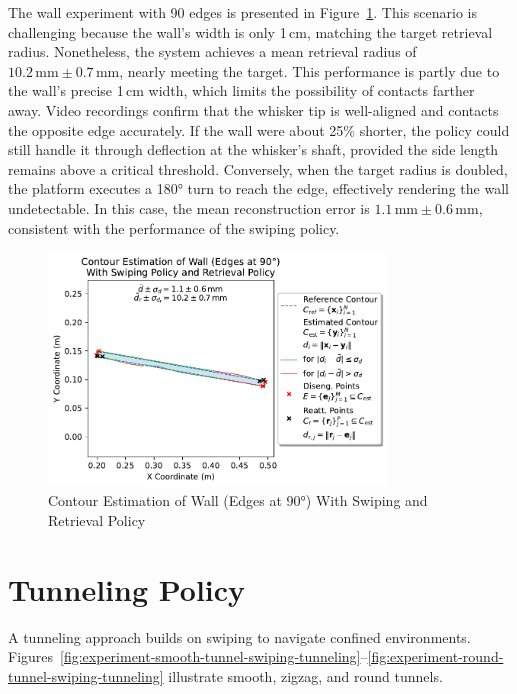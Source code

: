 The wall experiment with 90\degree{} edges is presented in Figure~\ref{fig:experiment-wall-edges-90deg-swiping-retrieval}.
This scenario is challenging because the wall’s width is only 1\,cm, matching the target retrieval radius.
Nonetheless, the system achieves a mean retrieval radius of $10.2\,\text{mm} \pm 0.7\,\text{mm}$, nearly meeting the target.
This performance is partly due to the wall’s precise 1\,cm width, which limits the possibility of contacts farther away.
Video recordings confirm that the whisker tip is well-aligned and contacts the opposite edge accurately.
If the wall were about 25\% shorter, the policy could still handle it through deflection at the whisker’s shaft, provided the side length remains above a critical threshold.
Conversely, when the target radius is doubled, the platform executes a 180° turn to reach the edge, effectively rendering the wall undetectable.
In this case, the mean reconstruction error is $1.1\,\text{mm} \pm 0.6\,\text{mm}$, consistent with the performance of the swiping policy.

\begin{figure}[htb]
    \centering
    \includegraphics[width=0.8\textwidth]{figures/experiments/wall-edges-90deg-swiping-retrieval}
    \caption{Contour Estimation of Wall (Edges at 90°) With Swiping and Retrieval Policy}
    \label{fig:experiment-wall-edges-90deg-swiping-retrieval}
\end{figure}


\section{Tunneling Policy}
A tunneling approach builds on swiping to navigate confined environments.
Figures~\ref{fig:experiment-smooth-tunnel-swiping-tunneling}--\ref{fig:experiment-round-tunnel-swiping-tunneling} illustrate smooth, zigzag, and round tunnels.

